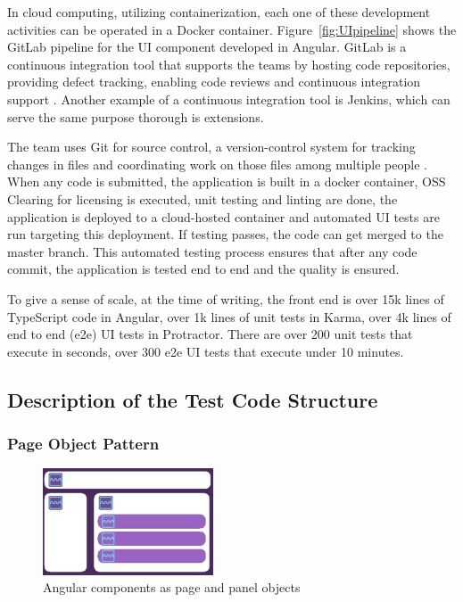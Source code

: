 \documentclass[conference]{IEEEtran}
\begin{document}
	In cloud computing, utilizing containerization, each one of these development activities can be operated in a Docker container.
	Figure~\ref{fig:UIpipeline} shows the GitLab pipeline for the UI component developed in Angular.
	GitLab is a continuous integration tool that supports the teams by hosting code repositories, providing defect tracking, enabling code reviews and continuous integration support \cite{wiki:gitlab}. 
	Another example of a continuous integration tool is Jenkins, which can serve the same purpose thorough is extensions.


	The team uses Git for source control, a version-control system for tracking changes in files and coordinating work on those files among multiple people \cite{wiki:git}. 
	When any code is submitted, the application is built in a docker container, OSS Clearing for licensing is executed, unit testing and linting are done, the application is deployed to a cloud-hosted container and automated UI tests are run targeting this deployment.
	If testing passes, the code can get merged to the master branch. 
	This automated testing process ensures that after any code commit, the application is tested end to end and the quality is ensured. 
	
	To give a sense of scale, at the time of writing, the front end is over 15k lines of TypeScript code in Angular, over 1k lines of unit tests in Karma, over 4k lines of end to end (e2e) UI tests in Protractor. 
	There are over 200 unit tests that execute in seconds, over 300 e2e UI tests that execute under 10 minutes. 


\subsection{Description of the Test Code Structure}

	\subsubsection{Page Object Pattern}

	\begin{figure}[!b]
		\includegraphics[width=0.45\textwidth,]{angular.pdf}
	\caption{Angular components as page and panel objects}
	\label{fig:angular}
	\end{figure}
\end{document}
